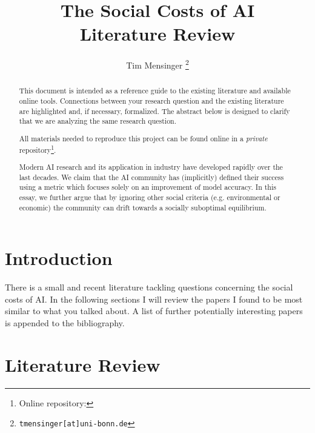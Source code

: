 \documentclass[a4paper, 12pt]{article}
\title{\textbf{The Social Costs of AI}\\
    \Large Literature Review
}
\date{}
\author{Tim Mensinger%
  \thanks{\texttt{tmensinger[at]uni-bonn.de}}
}
\affil{Bonn Graduate School of Economics}
\begin{document}
\onehalfspacing


\maketitle

\renewcommand{\abstractname}{Preamble}
\begin{abstract}
    \noindent This document is intended as a reference guide to the existing literature
    and available online tools. Connections between your research question and the
    existing literature are highlighted and, if necessary, formalized. The abstract
    below is designed to clarify that we are analyzing the same research question.

    All materials needed to reproduce this project can be found online in a
    \emph{private} repository\footnote{Online repository:
    }.
\end{abstract}

\renewcommand{\abstractname}{Abstract}
\begin{abstract}
    \noindent Modern AI research and its application in industry have developed rapidly
    over the last decades. We claim that the AI community has (implicitly) defined their
    success using a metric which focuses solely on an improvement of model accuracy. In
    this essay, we further argue that by ignoring other social criteria (e.g.
    environmental or economic) the community can drift towards a socially suboptimal
    equilibrium.
\end{abstract}
\thispagestyle{empty}

\newpage



\section{Introduction}

There is a small and recent literature tackling questions concerning the social costs of
AI. In the following sections I will review the papers I found to be most similar to
what you talked about. A list of further potentially interesting papers is appended to
the bibliography.


\section{Literature Review}
\end{document}
